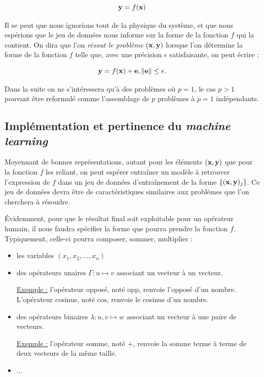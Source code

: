 \documentclass[a4paper,12pt]{article}
\begin{document}
\[
\vb y = f(\vb x)
\]

Il se peut que nous ignorions tout de la physique du système, et que nous espérions que le jeu de données nous informe sur la forme de la fonction $f$ qui la contient. On dira que l'on \emph{résout le problème} $(\vb x, \vb y)$ lorsque l'on détermine la forme de la fonction $f$ telle que, avec une précision $\epsilon$ satisfaisante, on peut écrire : 

\[
\vb y = f(\vb x) + \vb e, \norm{\vb e} \leq \epsilon.
\]

Dans la suite on ne s'intéressera qu'à des problèmes où $p = 1$, le cas $p>1$ pouvant être reformulé comme l'assemblage de $p$ problèmes à $p=1$ indépendants.

\subsection{Implémentation et pertinence du \emph{machine learning}}

Moyennant de bonnes représentations, autant pour les éléments $(\vb x, \vb y)$ que pour la fonction $f$ les reliant, on peut espérer entraîner un modèle à retrouver l'expression de $f$ dans un jeu de données d'entraînement de la forme $\{(\vb x, \vb y)_j\}$. Ce jeu de données devra être de caractéristiques similaires aux problèmes que l'on cherchera à résoudre.

Évidemment, pour que le résultat final soit exploitable pour un opérateur humain, il nous faudra spécifier la forme que pourra prendre la fonction $f$. Typiquement, celle-ci pourra composer, sommer, multiplier :

\begin{itemize}

\item les variables $(x_1, x_2, ..., x_n)$

\item des opérateurs unaires $\Gamma : u \mapsto v$ associant un vecteur à un vecteur.

\underline{Exemple :} l'opérateur opposé, noté $\mathrm{opp}$, renvoie l'opposé d'un nombre. L'opérateur cosinus, noté $\mathrm{cos}$, renvoie le cosinus d'un nombre.

\item des opérateurs binaires $\lambda : u, v \mapsto w$ associant un vecteur à une paire de vecteurs.

\underline{Exemple :} l'opérateur somme, noté $+$, renvoie la somme terme à terme de deux vecteurs de la même taille.

\item ...

\end{itemize}
\end{document}

